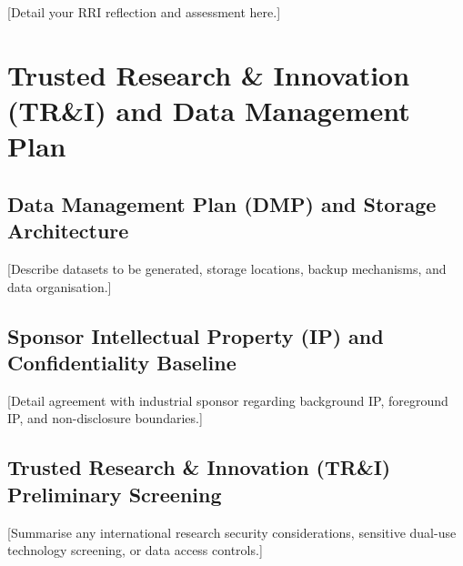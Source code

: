 \documentclass[year1,hideguidance]{idcore-ar}
\begin{document}
[Detail your RRI reflection and assessment here.]


\newpage
\section{Trusted Research \& Innovation (TR\&I) and Data Management Plan}

\subsection{Data Management Plan (DMP) and Storage Architecture}
[Describe datasets to be generated, storage locations, backup mechanisms, and data organisation.]

\subsection{Sponsor Intellectual Property (IP) and Confidentiality Baseline}
[Detail agreement with industrial sponsor regarding background IP, foreground IP, and non-disclosure boundaries.]

\subsection{Trusted Research \& Innovation (TR\&I) Preliminary Screening}
[Summarise any international research security considerations, sensitive dual-use technology screening, or data access controls.]
\end{document}
